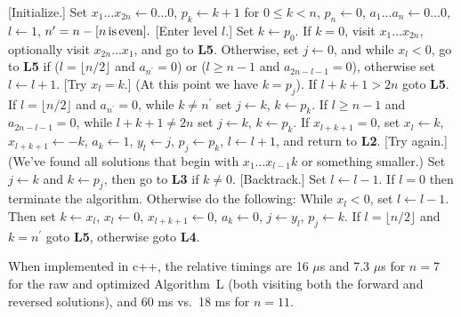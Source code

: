  [Initialize.] Set $x_1 \ldots x_{2 n} \leftarrow 0 
\ldots 0$, $p_k \leftarrow k + 1$ for $0 \leq k < n$, $p_n \leftarrow 0$, 
$a_{1} \ldots a_{n} \leftarrow 0 \ldots 0$, $l \leftarrow 1$,
$n^{\prime} = n - [n \rm{\, is\, even}].$
\vskip 0.05in
 [Enter level $l$.] Set $k \gets p_0$.  If $k = 0$, visit
$x_1 \ldots x_{2n}$, optionally visit $x_{2n} \ldots x_1$, and 
go to {\bf L5}.  Otherwise, set $j \leftarrow 0$, and
while $x_l < 0$, go to {\bf L5} if ($l = \lfloor n / 2 \rfloor$ and 
$a_{n^{\prime}} = 0$) or ($l \ge n - 1$ and $a_{2n - l - 1} = 0$), otherwise
set $l \leftarrow l + 1$.
\vskip 0.05in
 [Try $x_l = k$.] (At this point we have $k = p_j$).  
If $l + k + 1 > 2n$ goto {\bf L5}.  If $l = \lfloor n / 2 \rfloor$ and 
$a_{n^{\prime}} = 0$, while $k \ne n^{\prime}$ set $j \leftarrow k$, 
$k \leftarrow p_k$.  If $l \ge n - 1$ and $a_{2n - l - 1} = 0$, while 
$l + k + 1 \ne 2 n $ set $j \leftarrow k$, $k \leftarrow p_k$.  If 
$x_{l + k + 1} = 0$, set $x_l \leftarrow k$, $x_{l + k + 1} \leftarrow - k$,
$a_k \leftarrow 1$, $y_l \leftarrow j$, $p_j \leftarrow p_k$, 
$l \leftarrow l + 1$, and return to {\bf L2}.
\vskip 0.05in
 [Try again.] (We've found all solutions that begin with 
$x_1 \ldots x_{l-1} k$ or something smaller.) Set $j \leftarrow k$ and 
$k \leftarrow p_j$, then go to {\bf L3} if $k \ne 0$.
\vskip 0.05in
 [Backtrack.] Set $l \leftarrow l - 1$.   If $l = 0$ then 
terminate the algorithm. Otherwise do the following: While $x_l < 0$, set 
$l \leftarrow l - 1$.  Then set $k \leftarrow x_l$, $x_l \leftarrow 0$, 
$x_{l + k + 1} \leftarrow 0$, $a_k \leftarrow 0$, $j \leftarrow y_l$, 
$p_j \leftarrow k$.  If $l = \lfloor n / 2 \rfloor$ and $k = n^{\prime}$
goto {\bf L5}, otherwise goto {\bf L4}.

When implemented in c++, the relative timings are 16 $\mu$s and 7.3 $\mu$s 
for $n = 7$ for the raw and optimized Algorithm~L (both visiting both the 
forward and reversed solutions), and 60 ms vs.\ 18 ms for $n = 11$.

\bye

\bye